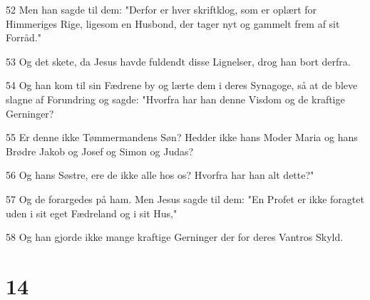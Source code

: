 \par 52 Men han sagde til dem: "Derfor er hver skriftklog, som er oplært for Himmeriges Rige, ligesom en Husbond, der tager nyt og gammelt frem af sit Forråd."
\par 53 Og det skete, da Jesus havde fuldendt disse Lignelser, drog han bort derfra.
\par 54 Og han kom til sin Fædrene by og lærte dem i deres Synagoge, så at de bleve slagne af Forundring og sagde: "Hvorfra har han denne Visdom og de kraftige Gerninger?
\par 55 Er denne ikke Tømmermandens Søn? Hedder ikke hans Moder Maria og hans Brødre Jakob og Josef og Simon og Judas?
\par 56 Og hans Søstre, ere de ikke alle hos os? Hvorfra har han alt dette?"
\par 57 Og de forargedes på ham. Men Jesus sagde til dem: "En Profet er ikke foragtet uden i sit eget Fædreland og i sit Hus,"
\par 58 Og han gjorde ikke mange kraftige Gerninger der for deres Vantros Skyld.

\chapter{14}

